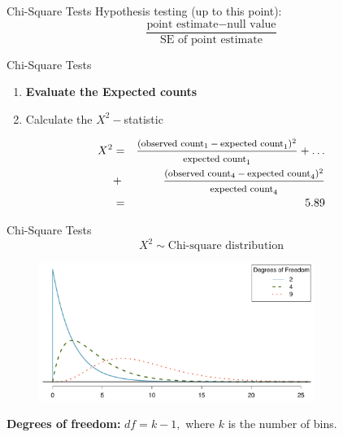 \documentclass[12pt,a4paper]{beamer}
\begin{document}
		\begin{frame}{Chi-Square Tests}
Hypothesis testing (up to this point):
$$ \frac{\text{point estimate} - \text{null value}}{\text{SE of point estimate}} $$
		\end{frame}
		\begin{frame}{Chi-Square Tests}
			\begin{enumerate}
			\item\textbf{Evaluate the Expected counts}
			\begin{table}[h]
			\centering
			
			\end{table}
			\item Calculate the $X^2-$statistic
			\end{enumerate}
			
			 \small\begin{eqnarray*}
			X^2 &=&
				\frac
				{\text{\footnotesize$(\text{observed count}_1 - \text{expected count}_1)^2$}}
				{\text{\footnotesize$\text{expected count}_1$}}
				+ \dots \\
				&+& \frac
				{\text{\footnotesize$(\text{observed count}_4 - \text{expected count}_4)^2$}}
				{\text{\footnotesize$\text{expected count}_4$}}\\
				&=&5.89
			\end{eqnarray*}
		\end{frame}
		\begin{frame}{Chi-Square Tests}
			\[X^2\sim \text{Chi-square distribution}\]
			\begin{figure}[h]
			\centering
			\includegraphics[width=0.8\textwidth]{figures/chiSquareDistributionWithInceasingDF/chiSquareDistributionWithInceasingDF}
			\label{chiSquareDistributionWithInceasingDF}
			\end{figure}
			\textbf{Degrees of freedom:} $df=k-1,$ where $k$ is the number of bins.
		\end{frame}
\end{document}
